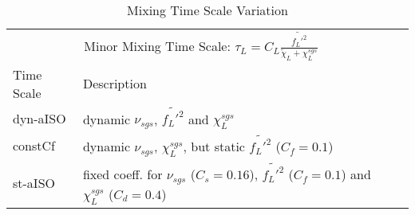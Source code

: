 \begin{table}[hbt]
    \caption{Mixing Time Scale Variation}
    \centering
    \begin{tabular}{llr}
        \toprule
        \multicolumn{2}{c}{Minor Mixing Time Scale: $\tau_L = C_{L} \frac{\widetilde{f_L'^2} }{\tilde{\chi}_L + \chi^{sgs}_L}$} \\
        \cmidrule(r){1-2}
        Time Scale & Description \\
        \midrule
        dyn-aISO & dynamic $\nu_{sgs}$, $\widetilde{f_L'^2}$ and $\chi^{sgs}_L$ \\
        constCf & dynamic $\nu_{sgs}$, $\chi^{sgs}_L$, but static $\widetilde{f_L'^2}$ ($C_f=0.1$) \\
        st-aISO & fixed coeff. for $\nu_{sgs}$ ($C_s=0.16$), $\widetilde{f_L'^2}$ ($C_f=0.1$) and $\chi^{sgs}_L$ ($C_d=0.4$) \\
        \bottomrule
    \end{tabular}
    \label{tab:MixTime}
\end{table}